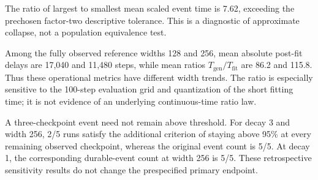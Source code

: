 The ratio of largest to smallest mean scaled event time is 7.62, exceeding the prechosen factor-two descriptive tolerance. This is a diagnostic of approximate collapse, not a population equivalence test.

Among the fully observed reference widths 128 and 256, mean absolute post-fit delays are 17,040 and 11,480 steps, while mean ratios $T_{\mathrm{gen}}/T_{\mathrm{fit}}$ are 86.2 and 115.8. Thus these operational metrics have different width trends. The ratio is especially sensitive to the 100-step evaluation grid and quantization of the short fitting time; it is not evidence of an underlying continuous-time ratio law.

A three-checkpoint event need not remain above threshold. For decay 3 and width 256, 2/5 runs satisfy the additional criterion of staying above 95\% at every remaining observed checkpoint, whereas the original event count is 5/5. At decay 1, the corresponding durable-event count at width 256 is 5/5. These retrospective sensitivity results do not change the prespecified primary endpoint.
